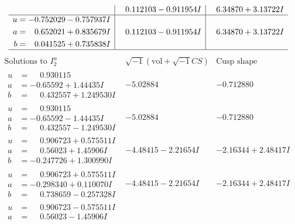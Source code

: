 \documentclass[1p]{elsarticle_modified}
\theoremstyle{definition}
\newcommand{\I}{\sqrt{-1}}
\begin{document}
$$\begin{array}{c|c|c}
 & \phantom{-}0.112103 - 0.911954 I & \phantom{-}6.34870 + 3.13722 I \\ \hline\begin{aligned}
u &= -0.752029 - 0.757937 I \\
a &= \phantom{-}0.652021 + 0.835679 I \\
b &= \phantom{-}0.041525 + 0.735838 I\end{aligned}
 & \phantom{-}0.112103 - 0.911954 I & \phantom{-}6.34870 + 3.13722 I\\
 \hline 
 \end{array}$$\newpage$$\begin{array}{c|c|c}  
\text{Solutions to }I^u_{2}& \I (\text{vol} + \sqrt{-1}CS) & \text{Cusp shape}\\
 \hline 
\begin{aligned}
u &= \phantom{-}0.930115\phantom{ +0.000000I} \\
a &= -0.65592 + 1.44435 I \\
b &= \phantom{-}0.432557 + 1.249530 I\end{aligned}
 & -5.02884\phantom{ +0.000000I} & -0.712880\phantom{ +0.000000I} \\ \hline\begin{aligned}
u &= \phantom{-}0.930115\phantom{ +0.000000I} \\
a &= -0.65592 - 1.44435 I \\
b &= \phantom{-}0.432557 - 1.249530 I\end{aligned}
 & -5.02884\phantom{ +0.000000I} & -0.712880\phantom{ +0.000000I} \\ \hline\begin{aligned}
u &= \phantom{-}0.906723 + 0.575511 I \\
a &= \phantom{-}0.56023 + 1.45906 I \\
b &= -0.247726 + 1.300990 I\end{aligned}
 & -4.48415 - 2.21654 I & -2.16344 + 2.48417 I \\ \hline\begin{aligned}
u &= \phantom{-}0.906723 + 0.575511 I \\
a &= -0.298340 + 0.110070 I \\
b &= \phantom{-}0.738659 - 0.257328 I\end{aligned}
 & -4.48415 - 2.21654 I & -2.16344 + 2.48417 I \\ \hline\begin{aligned}
u &= \phantom{-}0.906723 - 0.575511 I \\
a &= \phantom{-}0.56023 - 1.45906 I \\

\end{aligned}
\end{array}$$
\end{document}

